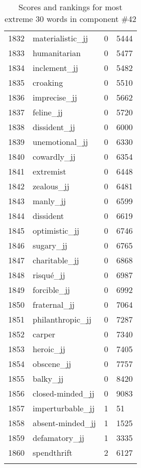 \begin{longtable}[!htbp]{| rlr@{.}l |}
    1832 & materialistic\_jj & 0 & 5444 \\
    1833 & humanitarian & 0 & 5477 \\
    1834 & inclement\_jj & 0 & 5482 \\
    1835 & croaking & 0 & 5510 \\
    1836 & imprecise\_jj & 0 & 5662 \\
    1837 & feline\_jj & 0 & 5720 \\
    1838 & dissident\_jj & 0 & 6000 \\
    1839 & unemotional\_jj & 0 & 6330 \\
    1840 & cowardly\_jj & 0 & 6354 \\
    1841 & extremist & 0 & 6448 \\
    1842 & zealous\_jj & 0 & 6481 \\
    1843 & manly\_jj & 0 & 6599 \\
    1844 & dissident & 0 & 6619 \\
    1845 & optimistic\_jj & 0 & 6746 \\
    1846 & sugary\_jj & 0 & 6765 \\
    1847 & charitable\_jj & 0 & 6868 \\
    1848 & risqué\_jj & 0 & 6987 \\
    1849 & forcible\_jj & 0 & 6992 \\
    1850 & fraternal\_jj & 0 & 7064 \\
    1851 & philanthropic\_jj & 0 & 7287 \\
    1852 & carper & 0 & 7340 \\
    1853 & heroic\_jj & 0 & 7405 \\
    1854 & obscene\_jj & 0 & 7757 \\
    1855 & balky\_jj & 0 & 8420 \\
    1856 & closed-minded\_jj & 0 & 9083 \\
    1857 & imperturbable\_jj & 1 & 51 \\
    1858 & absent-minded\_jj & 1 & 1525 \\
    1859 & defamatory\_jj & 1 & 3335 \\
    1860 & spendthrift & 2 & 6127 \\
    \hline
    \caption{Scores and rankings for most extreme 30 words in component \#42} \\
\end{longtable}

